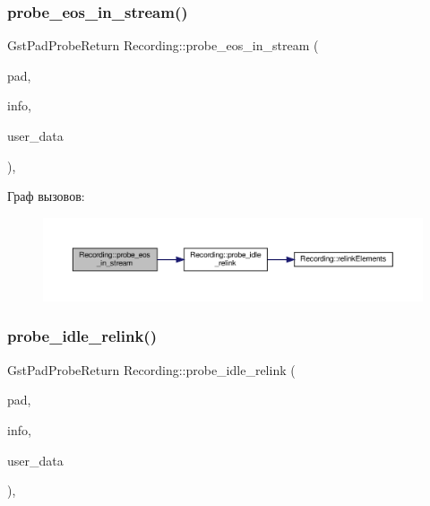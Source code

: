 \subsubsection{\texorpdfstring{probe\+\_\+eos\+\_\+in\+\_\+stream()}{probe\_eos\_in\_stream()}}
{\footnotesize\ttfamily Gst\+Pad\+Probe\+Return Recording\+::probe\+\_\+eos\+\_\+in\+\_\+stream (\begin{DoxyParamCaption}\item[{Gst\+Pad $\ast$}]{pad,  }\item[{Gst\+Pad\+Probe\+Info $\ast$}]{info,  }\item[{gpointer}]{user\+\_\+data }\end{DoxyParamCaption})\hspace{0.3cm}{\ttfamily [static]}, {\ttfamily [private]}}

Граф вызовов\+:\nopagebreak
\begin{figure}[H]
\begin{center}
\leavevmode
\includegraphics[width=350pt]{class_recording_a235992b4e8c358b6a648d84ed1e69969_cgraph}
\end{center}
\end{figure}
\mbox{\label{class_recording_a489e974a8481fdc9b6161c96f59ece8e}} 
\subsubsection{\texorpdfstring{probe\+\_\+idle\+\_\+relink()}{probe\_idle\_relink()}}
{\footnotesize\ttfamily Gst\+Pad\+Probe\+Return Recording\+::probe\+\_\+idle\+\_\+relink (\begin{DoxyParamCaption}\item[{Gst\+Pad $\ast$}]{pad,  }\item[{Gst\+Pad\+Probe\+Info $\ast$}]{info,  }\item[{gpointer}]{user\+\_\+data }\end{DoxyParamCaption})\hspace{0.3cm}{\ttfamily [static]}, {\ttfamily [private]}}

